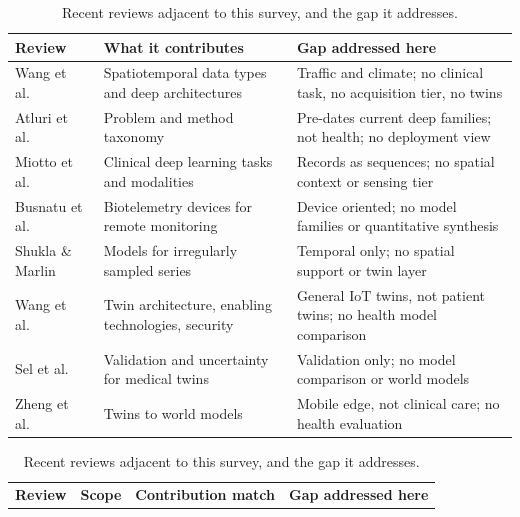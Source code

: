 \documentclass[journal]{IEEEtran}
\newif\ifsubmission
\begin{document}
\begin{table}[t]
\centering
\caption{Recent reviews adjacent to this survey, and the gap it addresses.}
\label{tab:related-surveys}
\ifsubmission
\scriptsize
\setlength{\tabcolsep}{4pt}
\renewcommand{\arraystretch}{1.08}
\begin{tabularx}{\textwidth}{>{\raggedright\arraybackslash}p{3.1cm} >{\raggedright\arraybackslash}X >{\raggedright\arraybackslash}X}
\toprule
\textbf{Review} & \textbf{What it contributes} & \textbf{Gap addressed here} \\
\midrule
Wang et al.~\cite{wang2022deep} & Spatiotemporal data types and deep architectures & Traffic and climate; no clinical task, no acquisition tier, no twins \\
\addlinespace[1pt]
Atluri et al.~\cite{atluri2018stdm} & Problem and method taxonomy & Pre-dates current deep families; not health; no deployment view \\
\addlinespace[1pt]
Miotto et al.~\cite{miotto2018deeplearning} & Clinical deep learning tasks and modalities & Records as sequences; no spatial context or sensing tier \\
\addlinespace[1pt]
Busnatu et al.~\cite{Busnatu2022} & Biotelemetry devices for remote monitoring & Device oriented; no model families or quantitative synthesis \\
\addlinespace[1pt]
Shukla \& Marlin~\cite{shukla2021irregular} & Models for irregularly sampled series & Temporal only; no spatial support or twin layer \\
\addlinespace[1pt]
Wang et al.~\cite{Wang2023Survey} & Twin architecture, enabling technologies, security & General IoT twins, not patient twins; no health model comparison \\
\addlinespace[1pt]
Sel et al.~\cite{Sel2025VVUQ} & Validation and uncertainty for medical twins & Validation only; no model comparison or world models \\
\addlinespace[1pt]
Zheng et al.~\cite{Zheng2026DTtoWM} & Twins to world models & Mobile edge, not clinical care; no health evaluation \\
\bottomrule
\end{tabularx}
\else
\footnotesize
\setlength{\tabcolsep}{4pt}
\renewcommand{\arraystretch}{1.1}
\begin{tabularx}{\textwidth}{>{\raggedright\arraybackslash}p{2.5cm} >{\raggedright\arraybackslash}p{2.6cm} >{\raggedright\arraybackslash}X >{\raggedright\arraybackslash}X}
\toprule
\textbf{Review} & \textbf{Scope} & \textbf{Contribution match} & \textbf{Gap addressed here} \\

\end{tabularx}
\end{table}
\end{document}
